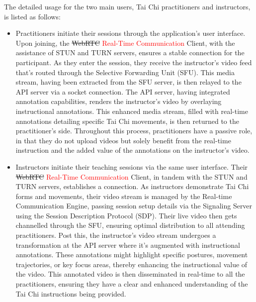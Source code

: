 \documentclass[12pt]{article}
\begin{document}
The detailed usage for the two main users, Tai Chi practitioners and instructors, is listed as follows:
\begin{itemize}
    \item Practitioners initiate their sessions through the application's user interface. Upon joining, the \sout{WebRTC} \textcolor{red}{Real-Time Communication} Client, with the assistance of STUN and TURN servers, ensures a stable connection for the participant. As they enter the session, they receive the instructor's video feed that's routed through the Selective Forwarding Unit (SFU). This media stream, having been extracted from the SFU server, is then relayed to the API server via a socket connection. The API server, having integrated annotation capabilities, renders the instructor's video by overlaying instructional annotations. This enhanced media stream, filled with real-time annotations detailing specific Tai Chi movements, is then returned to the practitioner's side. Throughout this process, practitioners have a passive role, in that they do not upload videos but solely benefit from the real-time instruction and the added value of the annotations on the instructor's video.
    \item Instructors initiate their teaching sessions via the same user interface. Their \sout{WebRTC} \textcolor{red}{Real-Time Communication} Client, in tandem with the STUN and TURN servers, establishes a connection. As instructors demonstrate Tai Chi forms and movements, their video stream is managed by the Real-time Communication Engine, passing session setup details via the Signaling Server using the Session Description Protocol (SDP). Their live video then gets channelled through the SFU, ensuring optimal distribution to all attending practitioners. Post this, the instructor's video stream undergoes a transformation at the API server where it's augmented with instructional annotations. These annotations might highlight specific postures, movement trajectories, or key focus areas, thereby enhancing the instructional value of the video. This annotated video is then disseminated in real-time to all the practitioners, ensuring they have a clear and enhanced understanding of the Tai Chi instructions being provided.
\end{itemize}
\end{document}
